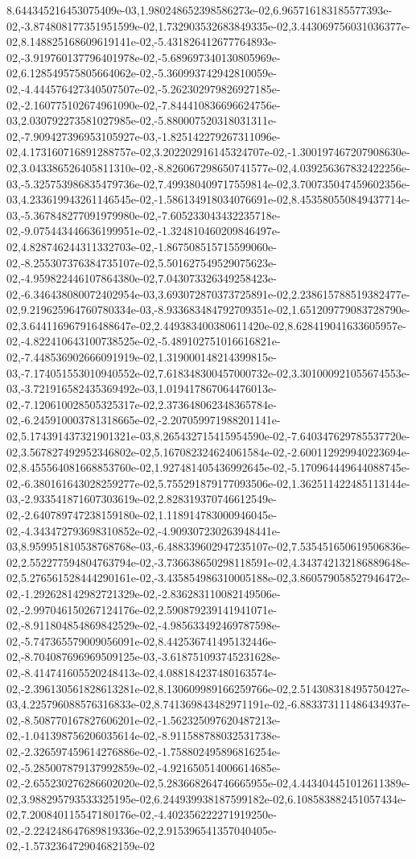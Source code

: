 8.644345216453075409e-03,1.980248652398586273e-02,6.965716183185577393e-02,-3.874808177351951599e-02,1.732903532683849335e-02,3.443069756031036377e-02,8.148825168609619141e-02,-5.431826412677764893e-02,-3.919760137796401978e-02,-5.689697340130805969e-02,6.128549575805664062e-02,-5.360993742942810059e-02,-4.444576427340507507e-02,-5.262302979826927185e-02,-2.160775102674961090e-02,-7.844410836696624756e-03,2.030792273581027985e-02,-5.880007520318031311e-02,-7.909427396953105927e-03,-1.825142279267311096e-02,4.173160716891288757e-02,3.202202916145324707e-02,-1.300197467207908630e-02,3.043386526405811310e-02,-8.826067298650741577e-02,4.039256367832422256e-03,-5.325753986835479736e-02,7.499380409717559814e-02,3.700735047459602356e-03,4.233619943261146545e-02,-1.586134918034076691e-02,8.453580550849437714e-03,-5.367848277091979980e-02,-7.605233043432235718e-02,-9.075443446636199951e-02,-1.324810460209846497e-02,4.828746244311332703e-02,-1.867508515715599060e-02,-8.255307376384735107e-02,5.501627549529075623e-02,-4.959822446107864380e-02,7.043073326349258423e-02,-6.346438080072402954e-03,3.693072870373725891e-02,2.238615788519382477e-02,9.219625964760780334e-03,-8.933683484792709351e-02,1.651209779083728790e-02,3.644116967916488647e-02,2.449383400380611420e-02,8.628419041633605957e-02,-4.822410643100738525e-02,-5.489102751016616821e-02,-7.448536902666091919e-02,1.319000148214399815e-03,-7.174051553010940552e-02,7.618348300457000732e-02,3.301000921055674553e-03,-3.721916582435369492e-03,1.019417867064476013e-02,-7.120610028505325317e-02,2.373648062348365784e-02,-6.245910003781318665e-02,-2.207059971988201141e-02,5.174391437321901321e-03,8.265432715415954590e-02,-7.640347629785537720e-02,3.567827492952346802e-02,5.167082324624061584e-02,-2.600112929940223694e-02,8.455564081668853760e-02,1.927481405436992645e-02,-5.170964449644088745e-02,-6.380161643028259277e-02,5.755291879177093506e-02,1.362511422485113144e-03,-2.933541871607303619e-02,2.828319370746612549e-02,-2.640789747238159180e-02,1.118914783000946045e-02,-4.343472793698310852e-02,-4.909307230263948441e-03,8.959951810538768768e-03,-6.488339602947235107e-02,7.535451650619506836e-02,2.552277594804763794e-02,-3.736638650298118591e-02,4.343742132186889648e-02,5.276561528444290161e-02,-3.435854986310005188e-02,3.860579058527946472e-02,-1.292628142982721329e-02,-2.836283110082149506e-02,-2.997046150267124176e-02,2.590879239141941071e-02,-8.911804854869842529e-02,-4.985633492469787598e-02,-5.747365579009056091e-02,8.442536741495132446e-02,-8.704087696969509125e-03,-3.618751093745231628e-02,-8.414741605520248413e-02,4.088184237480163574e-02,-2.396130561828613281e-02,8.130609989166259766e-02,2.514308318495750427e-03,4.225796088576316833e-02,8.741369843482971191e-02,-6.883373111486434937e-02,-8.508770167827606201e-02,-1.562325097620487213e-02,-1.041398756206035614e-02,-8.911588788032531738e-02,-2.326597459614276886e-02,-1.758802495896816254e-02,-5.285007879137992859e-02,-4.921650514006614685e-02,-2.655230276286602020e-02,5.283668264746665955e-02,4.443404451012611389e-02,3.988295793533325195e-02,6.244939938187599182e-02,6.108583882451057434e-02,7.200840115547180176e-02,-4.402356222271919250e-02,-2.224248647689819336e-02,2.915396541357040405e-02,-1.573236472904682159e-02
